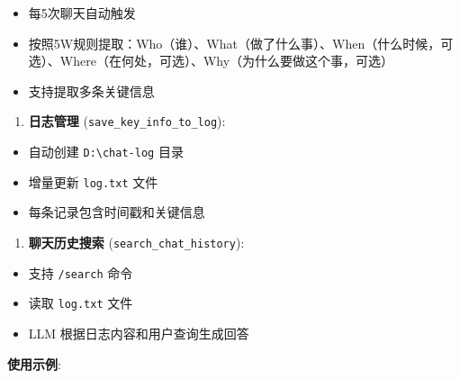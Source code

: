 \documentclass[]{article}
\providecommand{\tightlist}{%
  \setlength{\itemsep}{0pt}\setlength{\parskip}{0pt}}
\begin{document}
\begin{itemize}
\tightlist
\item
  每5次聊天自动触发
\item
  按照5W规则提取：Who（谁）、What（做了什么事）、When（什么时候，可选）、Where（在何处，可选）、Why（为什么要做这个事，可选）
\item
  支持提取多条关键信息
\end{itemize}

\begin{enumerate}
\def\labelenumi{\arabic{enumi}.}
\setcounter{enumi}{3}
\tightlist
\item
  \textbf{日志管理} (\texttt{save\_key\_info\_to\_log}):
\end{enumerate}

\begin{itemize}
\tightlist
\item
  自动创建 \texttt{D:\textbackslash{}chat-log} 目录
\item
  增量更新 \texttt{log.txt} 文件
\item
  每条记录包含时间戳和关键信息
\end{itemize}

\begin{enumerate}
\def\labelenumi{\arabic{enumi}.}
\setcounter{enumi}{4}
\tightlist
\item
  \textbf{聊天历史搜索} (\texttt{search\_chat\_history}):
\end{enumerate}

\begin{itemize}
\tightlist
\item
  支持 \texttt{/search} 命令
\item
  读取 \texttt{log.txt} 文件
\item
  LLM 根据日志内容和用户查询生成回答
\end{itemize}

\textbf{使用示例}:
\end{document}
